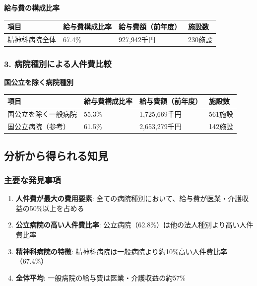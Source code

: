 \documentclass[
  a4paper,
  a4paper,
  11pt]{ltjsbook}
\providecommand{\tightlist}{%
  \setlength{\itemsep}{0pt}\setlength{\parskip}{0pt}}
\begin{document}
\textbf{給与費の構成比率}

\begin{longtable}[]{@{}llll@{}}
\toprule\noalign{}
項目 & 給与費構成比率 & 給与費額（前年度） & 施設数 \\
\midrule\noalign{}
\endhead
\bottomrule\noalign{}
\endlastfoot
精神科病院全体 & 67.4\% & 927,942千円 & 230施設 \\
\end{longtable}

\subsubsection{3.
病院種別による人件費比較}\label{ux75c5ux9662ux7a2eux5225ux306bux3088ux308bux4ebaux4ef6ux8cbbux6bd4ux8f03}

\textbf{国公立を除く病院種別}

\begin{longtable}[]{@{}llll@{}}
\toprule\noalign{}
項目 & 給与費構成比率 & 給与費額（前年度） & 施設数 \\
\midrule\noalign{}
\endhead
\bottomrule\noalign{}
\endlastfoot
国公立を除く一般病院 & 55.3\% & 1,725,669千円 & 561施設 \\
国公立病院（参考） & 61.5\% & 2,653,279千円 & 142施設 \\
\end{longtable}

\subsection{分析から得られる知見}\label{ux5206ux6790ux304bux3089ux5f97ux3089ux308cux308bux77e5ux898b}

\subsubsection{主要な発見事項}\label{ux4e3bux8981ux306aux767aux898bux4e8bux9805-1}

\begin{enumerate}
\def\labelenumi{\arabic{enumi}.}
\tightlist
\item
  \textbf{人件費が最大の費用要素}:
  全ての病院種別において、給与費が医業・介護収益の50\%以上を占める
\item
  \textbf{公立病院の高い人件費比率}:
  公立病院（62.8\%）は他の法人種別より高い人件費比率
\item
  \textbf{精神科病院の特徴}:
  精神科病院は一般病院より約10\%高い人件費比率（67.4\%）
\item
  \textbf{全体平均}: 一般病院の給与費は医業・介護収益の約57\%
\end{enumerate}
\end{document}
